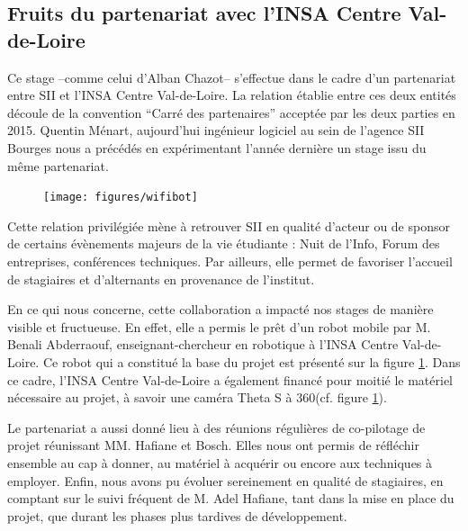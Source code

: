 \subsection{Fruits du partenariat avec l'INSA Centre Val-de-Loire}

Ce stage --comme celui d'Alban Chazot-- s'effectue dans le cadre d'un partenariat entre SII et l'INSA Centre Val-de-Loire. 
La relation établie entre ces deux entités découle de la convention ``Carré des partenaires'' acceptée par les deux parties en 2015.
Quentin Ménart, aujourd'hui ingénieur logiciel au sein de l'agence SII Bourges nous a précédés en expérimentant l'année dernière un stage issu du même partenariat.  

\begin{figure}[h]
    \centering
    \texttt{[image: figures/wifibot]}
    \label{fig:Wifibot}
\end{figure}


Cette relation privilégiée mène à retrouver SII en qualité d'acteur ou de sponsor de certains évènements majeurs de la vie étudiante : Nuit de l'Info, Forum des entreprises, conférences techniques.
Par ailleurs, elle permet de favoriser l'accueil de stagiaires et d'alternants en provenance de l'institut.  

En ce qui nous concerne, cette collaboration a impacté nos stages de manière visible et fructueuse.
En effet, elle a permis le prêt d'un robot mobile par M. Benali Abderraouf, enseignant-chercheur en robotique à l'INSA Centre Val-de-Loire. 
Ce robot qui a constitué la base du projet est présenté sur la figure \ref{fig:Wifibot}.
Dans ce cadre, l'INSA Centre Val-de-Loire a également financé pour moitié le matériel nécessaire au projet, à savoir une caméra Theta S à 360\degre (cf. figure \ref{fig:Wifibot}).

Le partenariat a aussi donné lieu à des réunions régulières de co-pilotage de projet réunissant MM. Hafiane et Bosch. 
Elles nous ont permis de réfléchir ensemble au cap à donner, au matériel à acquérir ou encore aux techniques à employer.
Enfin, nous avons pu évoluer sereinement en qualité de stagiaires, en comptant sur le suivi fréquent de M. Adel Hafiane, tant dans la mise en place du projet, que durant les phases plus tardives de développement.
